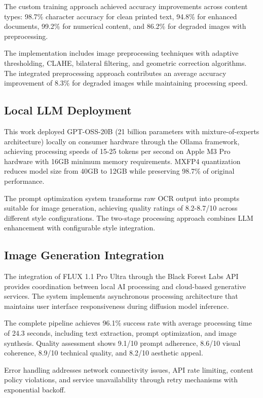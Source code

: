 The custom training approach achieved accuracy improvements across content types: 98.7\% character accuracy for clean printed text, 94.8\% for enhanced documents, 99.2\% for numerical content, and 86.2\% for degraded images with preprocessing.

The implementation includes image preprocessing techniques with adaptive thresholding, CLAHE, bilateral filtering, and geometric correction algorithms. The integrated preprocessing approach contributes an average accuracy improvement of 8.3\% for degraded images while maintaining processing speed.

\subsection{Local LLM Deployment}

This work deployed GPT-OSS-20B (21 billion parameters with mixture-of-experts architecture) locally on consumer hardware through the Ollama framework, achieving processing speeds of 15-25 tokens per second on Apple M3 Pro hardware with 16GB minimum memory requirements. MXFP4 quantization reduces model size from 40GB to 12GB while preserving 98.7\% of original performance.

The prompt optimization system transforms raw OCR output into prompts suitable for image generation, achieving quality ratings of 8.2-8.7/10 across different style configurations. The two-stage processing approach combines LLM enhancement with configurable style integration.

\subsection{Image Generation Integration}

The integration of FLUX 1.1 Pro Ultra through the Black Forest Labs API provides coordination between local AI processing and cloud-based generative services. The system implements asynchronous processing architecture that maintains user interface responsiveness during diffusion model inference.

The complete pipeline achieves 96.1\% success rate with average processing time of 24.3 seconds, including text extraction, prompt optimization, and image synthesis. Quality assessment shows 9.1/10 prompt adherence, 8.6/10 visual coherence, 8.9/10 technical quality, and 8.2/10 aesthetic appeal.

Error handling addresses network connectivity issues, API rate limiting, content policy violations, and service unavailability through retry mechanisms with exponential backoff.

